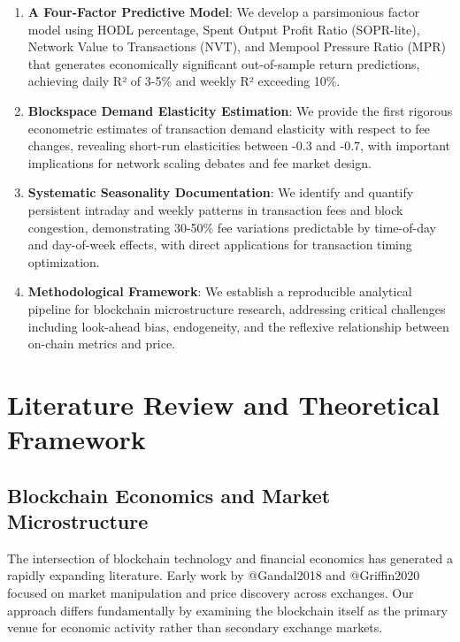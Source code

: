 \documentclass[
  12pt,
  letterpaper,
  DIV=11,
  numbers=noendperiod]{scrartcl}
\begin{document}
\begin{enumerate}
\def\labelenumi{\arabic{enumi}.}
\item
  \textbf{A Four-Factor Predictive Model}: We develop a parsimonious
  factor model using HODL percentage, Spent Output Profit Ratio
  (SOPR-lite), Network Value to Transactions (NVT), and Mempool Pressure
  Ratio (MPR) that generates economically significant out-of-sample
  return predictions, achieving daily R² of 3-5\% and weekly R²
  exceeding 10\%.
\item
  \textbf{Blockspace Demand Elasticity Estimation}: We provide the first
  rigorous econometric estimates of transaction demand elasticity with
  respect to fee changes, revealing short-run elasticities between -0.3
  and -0.7, with important implications for network scaling debates and
  fee market design.
\item
  \textbf{Systematic Seasonality Documentation}: We identify and
  quantify persistent intraday and weekly patterns in transaction fees
  and block congestion, demonstrating 30-50\% fee variations predictable
  by time-of-day and day-of-week effects, with direct applications for
  transaction timing optimization.
\item
  \textbf{Methodological Framework}: We establish a reproducible
  analytical pipeline for blockchain microstructure research, addressing
  critical challenges including look-ahead bias, endogeneity, and the
  reflexive relationship between on-chain metrics and price.
\end{enumerate}

\section{Literature Review and Theoretical
Framework}\label{literature-review-and-theoretical-framework}

\subsection{Blockchain Economics and Market
Microstructure}\label{blockchain-economics-and-market-microstructure}

The intersection of blockchain technology and financial economics has
generated a rapidly expanding literature. Early work by @Gandal2018 and
@Griffin2020 focused on market manipulation and price discovery across
exchanges. Our approach differs fundamentally by examining the
blockchain itself as the primary venue for economic activity rather than
secondary exchange markets.
\end{document}
